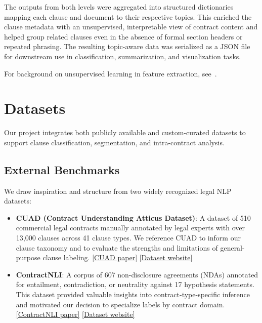 \documentclass[11pt, oneside]{article}   	%
\begin{document}
The outputs from both levels were aggregated into structured dictionaries mapping each clause and document to their respective topics. This enriched the clause metadata with an unsupervised, interpretable view of contract content and helped group related clauses even in the absence of formal section headers or repeated phrasing. The resulting topic-aware data was serialized as a JSON file for downstream use in classification, summarization, and visualization tasks.

\vspace{0.5em}
\noindent For background on unsupervised learning in feature extraction, see~\cite{coates2011unsupervised}.


\section*{Datasets}

Our project integrates both publicly available and custom-curated datasets to support clause classification, segmentation, and intra-contract analysis.

\subsection*{External Benchmarks}

We draw inspiration and structure from two widely recognized legal NLP datasets:

\begin{itemize}
    \item \textbf{CUAD (Contract Understanding Atticus Dataset)}: A dataset of 510 commercial legal contracts manually annotated by legal experts with over 13,000 clauses across 41 clause types. We reference CUAD to inform our clause taxonomy and to evaluate the strengths and limitations of general-purpose clause labeling. \href{https://arxiv.org/abs/2103.06268}{[CUAD paper]} \href{https://www.atticusprojectai.org/cuad}{[Dataset website]}

    \item \textbf{ContractNLI}: A corpus of 607 non-disclosure agreements (NDAs) annotated for entailment, contradiction, or neutrality against 17 hypothesis statements. This dataset provided valuable insights into contract-type-specific inference and motivated our decision to specialize labels by contract domain. \href{https://aclanthology.org/2021.emnlp-main.14}{[ContractNLI paper]} \href{https://stanfordnlp.github.io/contract-nli/}{[Dataset website]}
\end{itemize}
\end{document}
